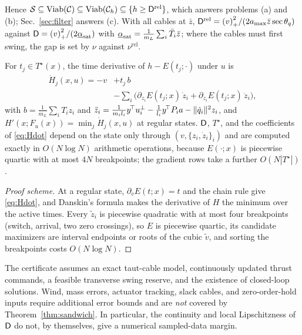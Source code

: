 Hence $\mathcal S\subseteq\operatorname{Viab}(\mathcal C)\subseteq\operatorname{Viab}(\mathcal C_h)\subseteq\{h\ge\mathsf{D}^{\mathrm{rel}}\}$, which answers problems (a) and (b); Sec.~\ref{sec:filter} answers (c). With all cables at $\bar z$, $\mathsf{D}^{\mathrm{rel}}={(v)}_{+}^2/(2a_{\max}\bar z\sec\theta_q)$ against $\mathsf{D}={(v)}_{+}^2/(2\underline{\alpha}_{\mathrm{sat}})$ with $\underline{\alpha}_{\mathrm{sat}}=\frac{1}{m_L}\sum_i\bar T_i\bar z$; where the cables must first swing, the gap is set by $\nu$ against $\nu^{\mathrm{rel}}$.

\begin{proposition}[Computation]\label{prop:decomp}
For $t_j\in T^\star(x)$, the time derivative of $h-E(t_j;\cdot)$ under $u$ is
\begin{align}
\dot H_j(x,u)=-v&+t_j\,b\label{eq:Hdot}\\
&-\sum_{i}\big(\partial_{z_i}E(t_j;x)\,\dot z_i+\partial_{\dot z_i}E(t_j;x)\,\ddot z_i\big),\nonumber
\end{align}
with $b=\frac{1}{m_L}\sum_iT_iz_i$ and $\ddot z_i=\frac{1}{m_il_i}y^{\!\top} u_i^\perp-\frac{1}{l_i}y^{\!\top} P_ia-\|\dot q_i\|^2z_i$, and $H'(x;F_u(x))=\min_j\dot H_j(x,u)$ at regular states. $\mathsf{D}$, $T^\star$, and the coefficients of \eqref{eq:Hdot} depend on the state only through $(v,\{z_i,\dot z_i\}_i)$ and are computed exactly in $O(N\log N)$ arithmetic operations, because $E(\cdot;x)$ is piecewise quartic with at most $4N$ breakpoints; the gradient rows take a further $O(N|T^\star|)$.
\end{proposition}
\begin{proof}[Proof scheme]
At a regular state, $\partial_vE(t;x)=t$ and the chain rule give \eqref{eq:Hdot}, and Danskin's formula makes the derivative of $H$ the minimum over the active times. Every $\tilde z_i$ is piecewise quadratic with at most four breakpoints (switch, arrival, two zero crossings), so $E$ is piecewise quartic, its candidate maximizers are interval endpoints or roots of the cubic $\tilde v$, and sorting the breakpoints costs $O(N\log N)$.
\end{proof}

\begin{remark}\label{rem:inner}
The certificate assumes an exact taut-cable model, continuously updated thrust commands, a feasible transverse swing reserve, and the existence of closed-loop solutions. Wind, mass errors, actuator tracking, slack cables, and zero-order-hold inputs require additional error bounds and are \emph{not} covered by Theorem~\ref{thm:sandwich}. In particular, the continuity and local Lipschitzness of $\mathsf{D}$ do not, by themselves, give a numerical sampled-data margin.
\end{remark}
